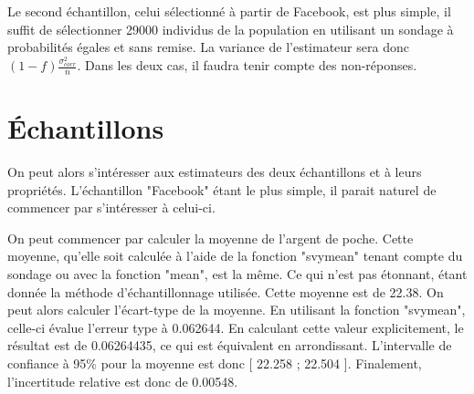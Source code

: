 \documentclass[11pt,a4paper]{report}
\begin{document}
Le second échantillon, celui sélectionné à partir de Facebook, est plus simple, il suffit de sélectionner 29000 individus de la population en utilisant un sondage à probabilités égales et sans remise. La variance de l'estimateur sera donc $(1-f)\frac{\sigma_{corr}^2}{n}$. Dans les deux cas, il faudra tenir compte des non-réponses.

\section*{Échantillons}

On peut alors s'intéresser aux estimateurs des deux échantillons et à leurs propriétés. L'échantillon "Facebook" étant le plus simple, il parait naturel de commencer par s'intéresser à celui-ci.\bigskip

On peut commencer par calculer la moyenne de l'argent de poche. Cette moyenne, qu'elle soit calculée à l'aide de la fonction "svymean" tenant compte du sondage ou avec la fonction "mean", est la même. Ce qui n'est pas étonnant, étant donnée la méthode d'échantillonnage utilisée. Cette moyenne est de 22.38. On peut alors calculer l'écart-type de la moyenne. En utilisant la fonction "svymean", celle-ci évalue l'erreur type à 0.062644. En calculant cette valeur explicitement, le résultat est de 0.06264435, ce qui est équivalent en arrondissant. L'intervalle de confiance à 95\% pour la moyenne est donc [ 22.258 ; 22.504 ]. Finalement, l'incertitude relative est donc de 0.00548.\bigskip
\end{document}
